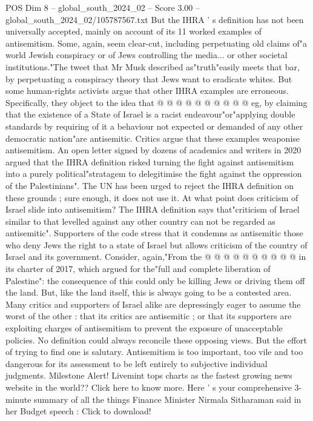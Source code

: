 \begin{textsample}{POS Dim 8 – global\_south\_2024\_02 – Score 3.00 – global\_south\_2024\_02/105787567.txt}
But the IHRA ' s definition has not been universally accepted, mainly on account of its 11 worked examples of antisemitism.
Some, again, seem clear-cut, including perpetuating old claims of"a world Jewish conspiracy or of Jews controlling the media... or other societal institutions."The tweet that Mr Musk described as"truth"easily meets that bar, by perpetuating a conspiracy theory that Jews want to eradicate whites.
But some human-rights activists argue that other IHRA examples are erroneous.
Specifically, they object to the idea that @ @ @ @ @ @ @ @ @ @ eg, by claiming that the existence of a State of Israel is a racist endeavour"or"applying double standards by requiring of it a behaviour not expected or demanded of any other democratic nation"are antisemitic.
Critics argue that these examples weaponise antisemitism.
An open letter signed by dozens of academics and writers in 2020 argued that the IHRA definition risked turning the fight against antisemitism into a purely political"stratagem to delegitimise the fight against the oppression of the Palestinians".
The UN has been urged to reject the IHRA definition on these grounds ; sure enough, it does not use it.
At what point does criticism of Israel slide into antisemitism?
The IHRA definition says that"criticism of Israel similar to that levelled against any other country can not be regarded as antisemitic".
Supporters of the code stress that it condemns as antisemitic those who deny Jews the right to a state of Israel but allows criticism of the country of Israel and its government.
Consider, again,"From the @ @ @ @ @ @ @ @ @ @ in its charter of 2017, which argued for the"full and complete liberation of Palestine": the consequence of this could only be killing Jews or driving them off the land.
But, like the land itself, this is always going to be a contested area.
Many critics and supporters of Israel alike are depressingly eager to assume the worst of the other : that its critics are antisemitic ; or that its supporters are exploiting charges of antisemitism to prevent the exposure of unacceptable policies.
No definition could always reconcile these opposing views.
But the effort of trying to find one is salutary.
Antisemitism is too important, too vile and too dangerous for its assessment to be left entirely to subjective individual judgments.
Milestone Alert!
Livemint tops charts as the fastest growing news website in the world??
Click here to know more.
Here ' s your comprehensive 3-minute summary of all the things Finance Minister Nirmala Sitharaman said in her Budget speech : Click to download!

\end{textsample}
